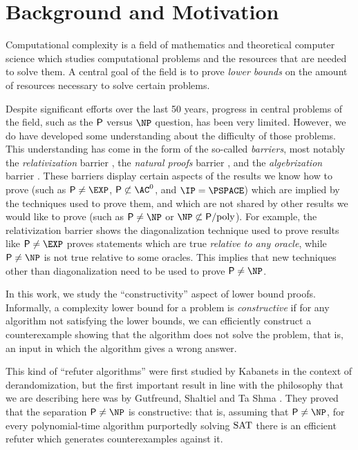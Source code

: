 \section{Background and Motivation}

Computational complexity is a field of mathematics and theoretical computer science 
which studies computational problems and the resources that are needed to solve them. 
A central goal of the field is to prove \emph{lower bounds} 
on the amount of resources necessary to solve certain problems. 

Despite significant efforts over the last 50 years, progress in central 
problems of the field, such as the $\mathsf{P}$ versus $\NP$ question, has been very limited. 
However, we do have developed some understanding about the difficulty of those problems.
This understanding has come in the form of the so-called \emph{barriers},
most notably the \emph{relativization} barrier \cite{BakerGillSolovay75},
the \emph{natural proofs} barrier \cite{RazborovRudich97}, and the 
\emph{algebrization} barrier \cite{AaronsonWigderson09}. 
These barriers display certain aspects of the results we know how to prove
(such as $\PTIME \neq \EXP$, $\PTIME \not\subset \AC^0$, and $\IP = \PSPACE$)
which are implied by the techniques used to prove them, and which are not 
shared by other results we would like to prove 
(such as $\PTIME \neq \NP$ or $\NP \not\subset \Ppoly$).
For example, the relativization barrier shows the diagonalization technique
used to prove results like $\PTIME \neq \EXP$ proves statements 
which are true \emph{relative to any oracle}, while $\PTIME \neq \NP$ is not true relative 
to some oracles. This implies that new techniques other than diagonalization
need to be used to prove $\PTIME \neq \NP$. 

In this work, we study the ``constructivity'' aspect of lower bound proofs. 
Informally, a complexity lower bound for a problem
is \emph{constructive} if for any algorithm not satisfying the lower bounds, 
we can efficiently construct a counterexample showing that the algorithm
does not solve the problem, that is, an input in which the algorithm gives a
wrong answer. 

This kind of ``refuter algorithms'' were first studied by Kabanets \cite{Kabanets01}
in the context of derandomization, but the first important result in line with the
philosophy that we are describing here was by Gutfreund, Shaltiel and Ta Shma 
\cite{Gutfreund05}. They proved that the separation $\PTIME \neq \NP$ is constructive:
that is, assuming that $\PTIME \neq \NP$, for every polynomial-time algorithm purportedly
solving $\mathrm{SAT}$ there is an efficient refuter which generates counterexamples against it. 

